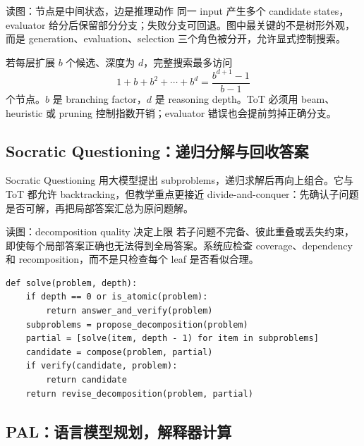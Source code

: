 
\begin{knowledgebox}{读图：节点是中间状态，边是推理动作}
同一 input 产生多个 candidate states，evaluator 给分后保留部分分支；失败分支可回退。图中最关键的不是树形外观，而是 generation、evaluation、selection 三个角色被分开，允许显式控制搜索。
\end{knowledgebox}

若每层扩展 $b$ 个候选、深度为 $d$，完整搜索最多访问
\[
1+b+b^2+\cdots+b^d=\frac{b^{d+1}-1}{b-1}
\]
个节点。$b$ 是 branching factor，$d$ 是 reasoning depth。ToT 必须用 beam、heuristic 或 pruning 控制指数开销；evaluator 错误也会提前剪掉正确分支。

\subsection{Socratic Questioning：递归分解与回收答案}

Socratic Questioning 用大模型提出 subproblems，递归求解后再向上组合。它与 ToT 都允许 backtracking，但教学重点更接近 divide-and-conquer：先确认子问题是否可解，再把局部答案汇总为原问题解。


\begin{knowledgebox}{读图：decomposition quality 决定上限}
若子问题不完备、彼此重叠或丢失约束，即使每个局部答案正确也无法得到全局答案。系统应检查 coverage、dependency 和 recomposition，而不是只检查每个 leaf 是否看似合理。
\end{knowledgebox}

\begin{lstlisting}[caption={带验证与回溯的结构化推理流程}]
def solve(problem, depth):
    if depth == 0 or is_atomic(problem):
        return answer_and_verify(problem)
    subproblems = propose_decomposition(problem)
    partial = [solve(item, depth - 1) for item in subproblems]
    candidate = compose(problem, partial)
    if verify(candidate, problem):
        return candidate
    return revise_decomposition(problem, partial)
\end{lstlisting}

\subsection{PAL：语言模型规划，解释器计算}

